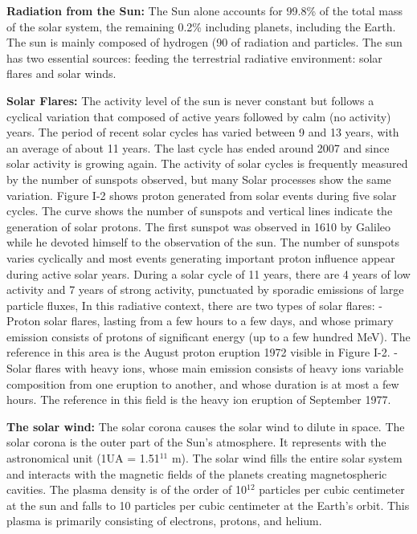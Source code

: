 \textbf{Radiation from the Sun:} The Sun alone accounts for 99.8\% of the total mass of the solar system, the remaining 0.2\% including planets, including the Earth. The sun is mainly composed of hydrogen (90%
of radiation and particles. The sun has two essential sources: feeding the terrestrial radiative environment: solar flares and solar winds. 

\textbf{Solar Flares:} The activity level of the sun is never constant but follows a cyclical variation that composed of active years followed by calm (no activity) years. The period of recent solar cycles has
varied between 9 and 13 years, with an average of about 11 years. The last cycle has ended around 2007 and since solar activity is growing again. The activity of solar cycles is frequently measured by the number of sunspots observed, but many
Solar processes show the same variation. Figure I-2 shows proton generated from solar events during five solar cycles. The curve shows the number of sunspots and vertical lines indicate the generation of solar protons. The first sunspot was observed in 1610 by Galileo while he devoted himself to the observation of the sun. The number of sunspots varies cyclically and most events
generating important proton influence appear during active solar years. During a solar cycle of 11 years, there are 4 years of low activity and 7 years of strong activity, punctuated by sporadic emissions of large particle fluxes, In this radiative context, there are two types of solar flares:
- Proton solar flares, lasting from a few hours to a few days, and
whose primary emission consists of protons of significant energy (up to
a few hundred MeV). The reference in this area is the August proton eruption 1972 visible in Figure I-2.
- Solar flares with heavy ions, whose main emission consists of heavy ions variable composition from one eruption to another, and whose duration is at most a few
hours. The reference in this field is the heavy ion eruption of September 1977.

\textbf{The solar wind:}
The solar corona causes the solar wind to dilute in space. The solar corona is the outer part of the Sun's atmosphere. It represents with the astronomical unit (1UA = 1.51$^{11}$ m). The solar wind fills the entire solar system and
interacts with the magnetic fields of the planets creating magnetospheric cavities. The
plasma density is of the order of 10$^{12}$ particles per cubic centimeter at the sun and falls to 10 particles per cubic centimeter at the Earth's orbit. This plasma is
primarily consisting of electrons, protons, and helium.


